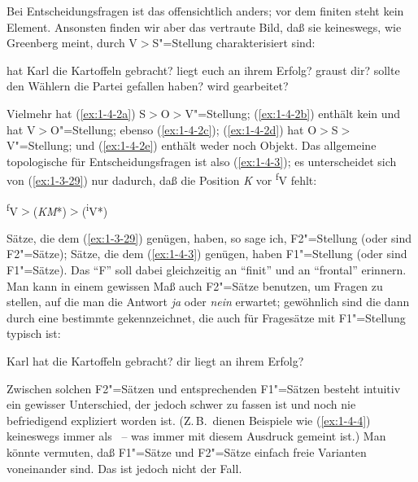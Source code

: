 \documentclass[output=paper]{langsci/langscibook}
\begin{document}
Bei Entscheidungsfragen ist das offensichtlich anders; vor dem finiten  steht
kein Element. Ansonsten finden wir aber das vertraute Bild, daß sie keineswegs, wie
Greenberg meint, durch V$>$S"=Stellung charakterisiert sind:
\begin{exe}
\ex\label{ex:1-4-2}
\begin{xlist}
\ex\label{ex:1-4-2a} hat Karl die Kartoffeln gebracht?
\ex\label{ex:1-4-2b} liegt euch an ihrem Erfolg?
\ex\label{ex:1-4-2c} graust dir?
\ex\label{ex:1-4-2d} sollte den Wählern die Partei gefallen haben?
\ex\label{ex:1-4-2e} wird gearbeitet?
\end{xlist}
\end{exe}
Vielmehr hat (\ref{ex:1-4-2a}) S$>$O$>$V"=Stellung; (\ref{ex:1-4-2b}) enthält kein  und hat V$>$O"=Stellung;
ebenso (\ref{ex:1-4-2c}); (\ref{ex:1-4-2d}) hat O$>$S$>$V"=Stellung; und (\ref{ex:1-4-2e}) enthält weder  noch Objekt. Das
allgemeine topologische  für Entscheidungsfragen ist also (\ref{ex:1-4-3}); es unterscheidet sich von (\ref{ex:1-3-29}) nur dadurch, daß die Position \textit{K} vor \textsuperscript{f}V fehlt:
\begin{exe}
\ex\label{ex:1-4-3}
\textsuperscript{f}V$>$(\textit{KM}*)$>$(\textsuperscript{i}V*)
\end{exe}
Sätze, die dem  (\ref{ex:1-3-29}) genügen, haben, so sage ich, F2"=Stellung (oder sind
F2"=Sätze); Sätze, die dem  (\ref{ex:1-4-3}) genügen, haben F1"=Stellung (oder sind F1"=Sätze). Das "`F"' soll dabei gleichzeitig an "`finit"' und an "`frontal"' erinnern.
\ssubsection{}%
\label{subsec:1-4.2}
Man kann in einem gewissen Maß auch F2"=Sätze benutzen, um Fragen zu stellen, auf die man die Antwort \textit{ja} oder \textit{nein} erwartet; gewöhnlich sind die dann
durch eine bestimmte  gekennzeichnet, die auch für Fragesätze mit F1"=Stellung typisch ist:
\begin{exe}
\ex\label{ex:1-4-4}
\begin{xlist}
\ex\label{ex:1-4-4a} Karl hat die Kartoffeln gebracht?
\ex\label{ex:1-4-4b} dir liegt an ihrem Erfolg?
\end{xlist}
\end{exe}
Zwischen solchen F2"=Sätzen und entsprechenden F1"=Sätzen besteht intuitiv ein gewisser Unterschied, der jedoch schwer zu fassen ist und noch nie befriedigend expliziert worden ist. (Z.\,B.\ dienen Beispiele wie (\ref{ex:1-4-4}) keineswegs immer als ~–
was immer mit diesem Ausdruck gemeint ist.) Man könnte vermuten, daß F1"=Sätze
und F2"=Sätze einfach freie Varianten voneinander sind. Das ist jedoch nicht der Fall.
\end{document}
